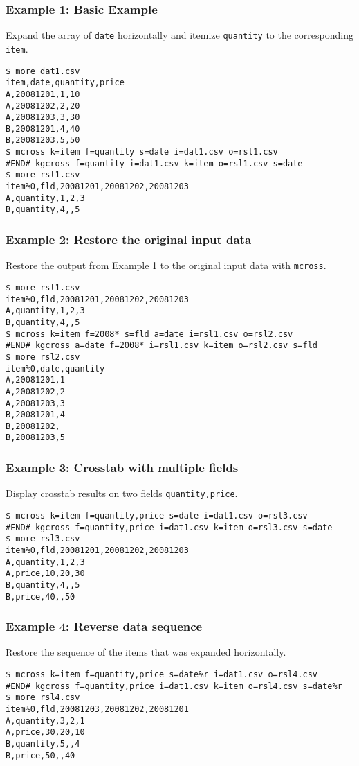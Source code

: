 \subsubsection*{Example 1: Basic Example}

Expand the array of \verb|date| horizontally and itemize \verb|quantity|
to the corresponding \verb|item|.


\begin{Verbatim}[baselinestretch=0.7,frame=single]
$ more dat1.csv
item,date,quantity,price
A,20081201,1,10
A,20081202,2,20
A,20081203,3,30
B,20081201,4,40
B,20081203,5,50
$ mcross k=item f=quantity s=date i=dat1.csv o=rsl1.csv
#END# kgcross f=quantity i=dat1.csv k=item o=rsl1.csv s=date
$ more rsl1.csv
item%0,fld,20081201,20081202,20081203
A,quantity,1,2,3
B,quantity,4,,5
\end{Verbatim}
\subsubsection*{Example 2: Restore the original input data}

Restore the output from Example 1 to the original input data with \verb|mcross|.


\begin{Verbatim}[baselinestretch=0.7,frame=single]
$ more rsl1.csv
item%0,fld,20081201,20081202,20081203
A,quantity,1,2,3
B,quantity,4,,5
$ mcross k=item f=2008* s=fld a=date i=rsl1.csv o=rsl2.csv
#END# kgcross a=date f=2008* i=rsl1.csv k=item o=rsl2.csv s=fld
$ more rsl2.csv
item%0,date,quantity
A,20081201,1
A,20081202,2
A,20081203,3
B,20081201,4
B,20081202,
B,20081203,5
\end{Verbatim}
\subsubsection*{Example 3: Crosstab with multiple fields}

Display crosstab results on two fields \verb|quantity,price|.


\begin{Verbatim}[baselinestretch=0.7,frame=single]
$ mcross k=item f=quantity,price s=date i=dat1.csv o=rsl3.csv
#END# kgcross f=quantity,price i=dat1.csv k=item o=rsl3.csv s=date
$ more rsl3.csv
item%0,fld,20081201,20081202,20081203
A,quantity,1,2,3
A,price,10,20,30
B,quantity,4,,5
B,price,40,,50
\end{Verbatim}
\subsubsection*{Example 4: Reverse data sequence}

Restore the sequence of the items that was expanded horizontally.


\begin{Verbatim}[baselinestretch=0.7,frame=single]
$ mcross k=item f=quantity,price s=date%r i=dat1.csv o=rsl4.csv
#END# kgcross f=quantity,price i=dat1.csv k=item o=rsl4.csv s=date%r
$ more rsl4.csv
item%0,fld,20081203,20081202,20081201
A,quantity,3,2,1
A,price,30,20,10
B,quantity,5,,4
B,price,50,,40
\end{Verbatim}
